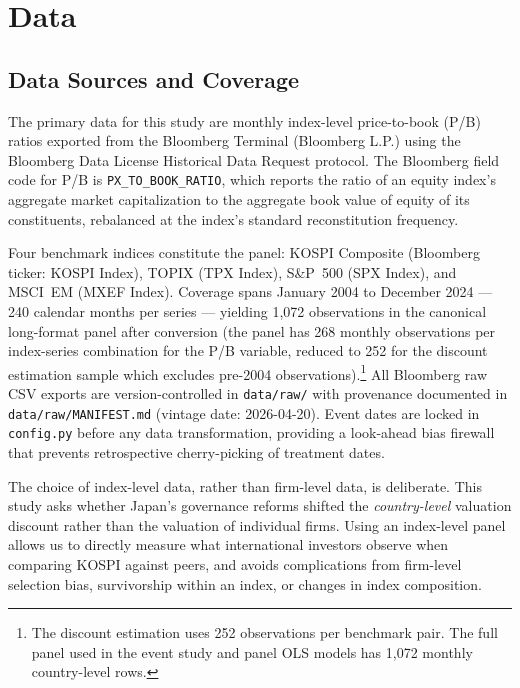 \documentclass[12pt]{article}
\begin{document}
\section{Data}
\label{sec:data}

\subsection{Data Sources and Coverage}

The primary data for this study are monthly index-level price-to-book (P/B) ratios exported
from the Bloomberg Terminal (Bloomberg L.P.) using the Bloomberg Data License
Historical Data Request protocol. The Bloomberg field code for P/B is
\texttt{PX\_TO\_BOOK\_RATIO}, which reports the ratio of an equity index's aggregate market
capitalization to the aggregate book value of equity of its constituents, rebalanced at
the index's standard reconstitution frequency.

Four benchmark indices constitute the panel: KOSPI Composite (Bloomberg ticker: KOSPI
Index), TOPIX (TPX Index), S\&P~500 (SPX Index), and MSCI~EM (MXEF Index). Coverage
spans January 2004 to December 2024 --- 240 calendar months per series --- yielding 1,072
observations in the canonical long-format panel after conversion (the panel has 268
monthly observations per index-series combination for the P/B variable, reduced to 252 for
the discount estimation sample which excludes pre-2004 observations).\footnote{The
discount estimation uses 252 observations per benchmark pair. The full panel used in the
event study and panel OLS models has 1,072 monthly country-level rows.} All Bloomberg
raw CSV exports are version-controlled in \texttt{data/raw/} with provenance documented in
\texttt{data/raw/MANIFEST.md} (vintage date: 2026-04-20). Event dates are locked in
\texttt{config.py} before any data transformation, providing a look-ahead bias firewall
that prevents retrospective cherry-picking of treatment dates.

The choice of index-level data, rather than firm-level data, is deliberate. This study
asks whether Japan's governance reforms shifted the \textit{country-level} valuation
discount rather than the valuation of individual firms. Using an index-level panel allows
us to directly measure what international investors observe when comparing KOSPI against
peers, and avoids complications from firm-level selection bias, survivorship within an
index, or changes in index composition.
\end{document}
